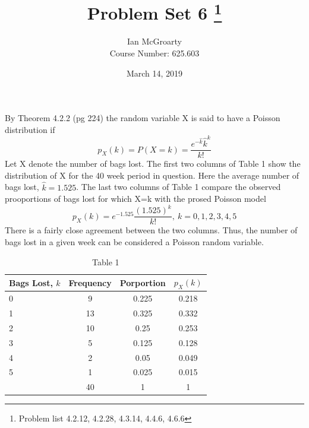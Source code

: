 \documentclass[12pt]{article}
\title{Problem Set 6 \thanks{Problem list 4.2.12, 4.2.28, 4.3.14, 4.4.6, 4.6.6}}
\author{Ian McGroarty \\
	Course Number: 625.603}
\date{March 14, 2019}
\newenvironment{problem}[2][Problem]{\begin{trivlist}
\item[\hskip \labelsep {\bfseries #1}\hskip \labelsep {\bfseries #2.}]}{\end{trivlist}}
\begin{document}
\maketitle
\newpage
\begin{problem}{4.2.12} 
By Theorem 4.2.2 (pg 224) the random variable X is said to have a Poisson distribution if
$$ 
p_X(k) = P(X=k)=\frac{e^{-\hat{k}} \hat{k}^k}{k!}
$$
Let X denote the number of bags lost. The first two columns of Table 1 show the distribution of X for the 40 week period in question. Here the average number of bags lost, $\hat{k} = 1.525$. The last two columns of Table 1 compare the observed prooportions of bags lost for which X=k with the prosed Poisson model
$$ p_X(k) = e^{-1.525}\frac{(1.525)^k}{k!}, \ k=0,1,2,3,4,5 $$
There is a fairly close agreement between the two columns. Thus, the number of bags lost in a given week can be considered a Poisson random variable. 
\begin{table}[h!]
	\begin{center}
	\caption{Table 1}
	\begin{tabular}{l|ccc}
Bags Lost, $k$	& Frequency	& Porportion	& $p_X(k)$ \\
\hline
0 &	9	& 0.225		& 0.218 \\
1&	13	&0.325		&0.332 \\
2&	10	&0.25		&0.253 \\
3&	5	&0.125		&0.128 \\
4&	2	&0.05		&0.049 \\
5&	1	&0.025		&0.015 \\
\hline
  &	40	&1 			&1 \\
	\end{tabular}
	\end{center}
\end{table}
\end{problem} 

\newpage
\end{document}
